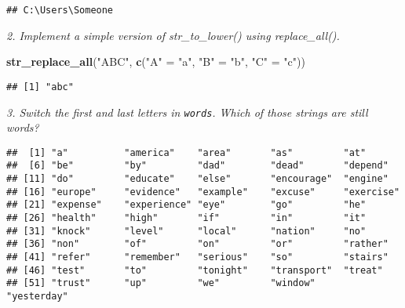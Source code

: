 \documentclass[]{article}
\newenvironment{Shaded}{\begin{snugshade}}{\end{snugshade}}
\newcommand{\KeywordTok}[1]{\textcolor[rgb]{0.13,0.29,0.53}{\textbf{#1}}}
\newcommand{\CharTok}[1]{\textcolor[rgb]{0.31,0.60,0.02}{#1}}
\newcommand{\StringTok}[1]{\textcolor[rgb]{0.31,0.60,0.02}{#1}}
\newcommand{\OperatorTok}[1]{\textcolor[rgb]{0.81,0.36,0.00}{\textbf{#1}}}
\newcommand{\NormalTok}[1]{#1}
\theoremstyle{definition}
\theoremstyle{definition}
\theoremstyle{definition}
\theoremstyle{remark}
\begin{document}
\begin{verbatim}
## C:\Users\Someone
\end{verbatim}

\emph{2. Implement a simple version of str\_to\_lower() using
replace\_all().}

\begin{Shaded}
\begin{Highlighting}[]
\KeywordTok{str_replace_all}\NormalTok{(}\StringTok{"ABC"}\NormalTok{, }\KeywordTok{c}\NormalTok{(}\StringTok{"A"}\NormalTok{ =}\StringTok{ "a"}\NormalTok{,}
                         \StringTok{"B"}\NormalTok{ =}\StringTok{ "b"}\NormalTok{,}
                         \StringTok{"C"}\NormalTok{ =}\StringTok{ "c"}\NormalTok{))}
\end{Highlighting}
\end{Shaded}

\begin{verbatim}
## [1] "abc"
\end{verbatim}

\emph{3. Switch the first and last letters in \texttt{words}. Which of
those strings are still words?}

\begin{Shaded}
\end{Shaded}

\begin{verbatim}
##  [1] "a"          "america"    "area"       "as"         "at"        
##  [6] "be"         "by"         "dad"        "dead"       "depend"    
## [11] "do"         "educate"    "else"       "encourage"  "engine"    
## [16] "europe"     "evidence"   "example"    "excuse"     "exercise"  
## [21] "expense"    "experience" "eye"        "go"         "he"        
## [26] "health"     "high"       "if"         "in"         "it"        
## [31] "knock"      "level"      "local"      "nation"     "no"        
## [36] "non"        "of"         "on"         "or"         "rather"    
## [41] "refer"      "remember"   "serious"    "so"         "stairs"    
## [46] "test"       "to"         "tonight"    "transport"  "treat"     
## [51] "trust"      "up"         "we"         "window"     "yesterday"
\end{verbatim}
\end{document}
